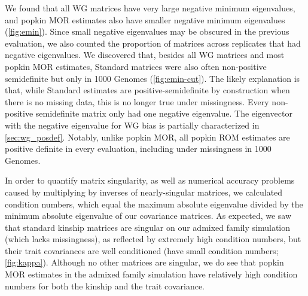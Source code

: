 \documentclass[11pt]{article}
\begin{document}
We found that all WG matrices have very large negative minimum eigenvalues, and popkin MOR estimates also have smaller negative minimum eigenvalues (\cref{fig:emin}).
Since small negative eigenvalues may be obscured in the previous evaluation, we also counted the proportion of matrices across replicates that had negative eigenvalues.
We discovered that, besides all WG matrices and most popkin MOR estimates, Standard matrices were also often non-positive semidefinite but only in 1000 Genomes (\cref{fig:emin-cut}).
The likely explanation is that, while Standard estimates are positive-semidefinite by construction when there is no missing data, this is no longer true under missingness.
Every non-positive semidefinite matrix only had one negative eigenvalue.
The eigenvector with the negative eigenvalue for WG bias is partially characterized in \cref{sec:wg_posdef}.
Notably, unlike popkin MOR, all popkin ROM estimates are positive definite in every evaluation, including under missingness in 1000 Genomes.

In order to quantify matrix singularity, as well as numerical accuracy problems caused by multiplying by inverses of nearly-singular matrices, we calculated condition numbers, which equal the maximum absolute eigenvalue divided by the minimum absolute eigenvalue of our covariance matrices.
As expected, we saw that standard kinship matrices are singular on our admixed family simulation (which lacks missingness), as reflected by extremely high condition numbers, but their trait covariances are well conditioned (have small condition numbers; \cref{fig:kappa}).
Although no other matrices are singular, we do see that popkin MOR estimates in the admixed family simulation have relatively high condition numbers for both the kinship and the trait covariance.
\end{document}
